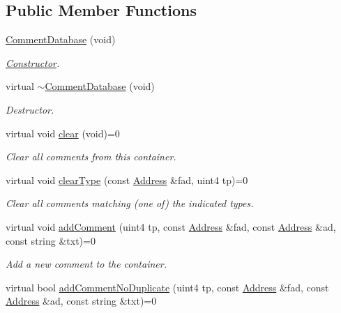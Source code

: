 \subsection*{Public Member Functions}
\begin{DoxyCompactItemize}
\item 
\mbox{\hyperlink{class_comment_database_a64f6c407ba9610d5375d228236e8d26f}{Comment\+Database}} (void)
\begin{DoxyCompactList}\small\item\em \mbox{\hyperlink{class_constructor}{Constructor}}. \end{DoxyCompactList}\item 
virtual \mbox{\hyperlink{class_comment_database_a0851784ab66cc52511427c6ec31073cd}{$\sim$\+Comment\+Database}} (void)
\begin{DoxyCompactList}\small\item\em Destructor. \end{DoxyCompactList}\item 
virtual void \mbox{\hyperlink{class_comment_database_a11e384fc79f6cf6e8c7af6c608df4baa}{clear}} (void)=0
\begin{DoxyCompactList}\small\item\em Clear all comments from this container. \end{DoxyCompactList}\item 
virtual void \mbox{\hyperlink{class_comment_database_af4467b35ea8555ddc77e810453051a96}{clear\+Type}} (const \mbox{\hyperlink{class_address}{Address}} \&fad, uint4 tp)=0
\begin{DoxyCompactList}\small\item\em Clear all comments matching (one of) the indicated types. \end{DoxyCompactList}\item 
virtual void \mbox{\hyperlink{class_comment_database_a0e7bd4fd808c28610f4867af22589f0c}{add\+Comment}} (uint4 tp, const \mbox{\hyperlink{class_address}{Address}} \&fad, const \mbox{\hyperlink{class_address}{Address}} \&ad, const string \&txt)=0
\begin{DoxyCompactList}\small\item\em Add a new comment to the container. \end{DoxyCompactList}\item 
virtual bool \mbox{\hyperlink{class_comment_database_a41b306ed1b9ac26a4b2c80a927be3364}{add\+Comment\+No\+Duplicate}} (uint4 tp, const \mbox{\hyperlink{class_address}{Address}} \&fad, const \mbox{\hyperlink{class_address}{Address}} \&ad, const string \&txt)=0

\end{DoxyCompactItemize}

